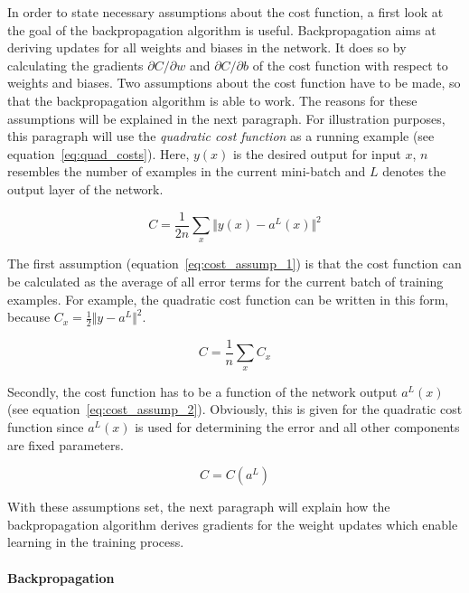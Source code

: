 In order to state necessary assumptions about the cost function, a first look
at the goal of the backpropagation algorithm is useful.
Backpropagation aims at deriving updates for all weights and biases in
the network.
It does so by calculating the gradients $\partial C / \partial w$ and 
$\partial C / \partial b$ of the cost function with respect to weights and
biases.
Two assumptions about the cost function have to be made, so that the 
backpropagation algorithm is able to work. 
The reasons for these assumptions will be explained in the next paragraph.
For illustration purposes, this paragraph will use the \textit{quadratic cost function}
as a running example (see equation~\ref{eq:quad_costs}).
Here, $y(x)$ is the desired output for input $x$, $n$ resembles the number of
examples in the current mini-batch and $L$ denotes the output layer of the
network.

\begin{equation}
  \label{eq:quad_costs}
  C = \frac{1}{2n} \sum_x \Vert y(x) - a^L(x) \Vert^2
\end{equation}

The first assumption (equation~\ref{eq:cost_assump_1}) is that the cost function 
can be calculated as the average of all error terms for the current batch
of training examples. For example, the quadratic cost function can be written in
this form, because $C_x = \frac{1}{2} \Vert y - a^L \Vert^2$.

\begin{equation}
  \label{eq:cost_assump_1}
  C = \frac{1}{n} \sum_x C_x
\end{equation}

Secondly, the cost function has to be a function of the network output $a^L(x)$
(see equation~\ref{eq:cost_assump_2}).
Obviously, this is given for the quadratic cost function since $a^L(x)$ is used
for determining the error and all other components are fixed parameters.

\begin{equation}
  \label{eq:cost_assump_2}
  C = C(a^L)
\end{equation}

With these assumptions set, the next paragraph will explain how the
backpropagation algorithm derives gradients for the weight updates which enable
learning in the training process.

\paragraph{Backpropagation}
\label{sub:backprop}

